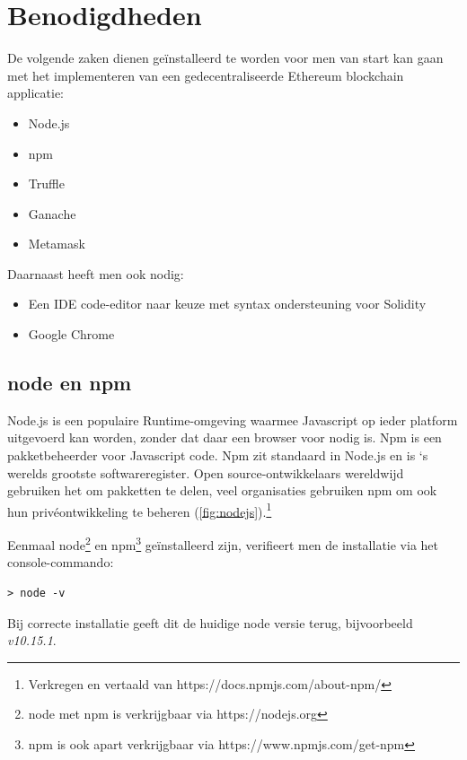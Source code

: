 \section{Benodigdheden}
\label{sec:benodigdheden}
	De volgende zaken dienen geïnstalleerd te worden voor men van start kan gaan met het implementeren van een gedecentraliseerde Ethereum blockchain applicatie:
	\begin{itemize}
		\item{Node.js}
		\item{npm}
		\item{Truffle}
		\item{Ganache}
		\item{Metamask}
	\end{itemize}
	Daarnaast heeft men ook nodig:
	\begin{itemize}
		\item{Een IDE code-editor naar keuze met syntax ondersteuning voor Solidity}
		\item{Google Chrome}
	\end{itemize}
	\subsection{ node en npm}
	Node.js is een populaire Runtime-omgeving waarmee Javascript op ieder platform uitgevoerd kan worden, zonder dat daar een browser voor nodig is. Npm is een pakketbeheerder voor Javascript code. Npm zit standaard in Node.js en is `s werelds grootste softwareregister. Open source-ontwikkelaars wereldwijd gebruiken het om pakketten te delen, veel organisaties gebruiken npm om ook hun privéontwikkeling te beheren (\ref{fig:nodejs}).\footnote{Verkregen en vertaald van https://docs.npmjs.com/about-npm/}
	
	Eenmaal node\footnote{node met npm is verkrijgbaar via https://nodejs.org} en npm\footnote{npm is ook apart verkrijgbaar via https://www.npmjs.com/get-npm} geïnstalleerd zijn, verifieert men de installatie via het console-commando: 
	\lstset{language=bash}
	\begin{lstlisting}[numbers=none]
	> node -v
	\end{lstlisting}Bij correcte installatie geeft dit de huidige node versie terug, bijvoorbeeld \textit{v10.15.1}. 
	
